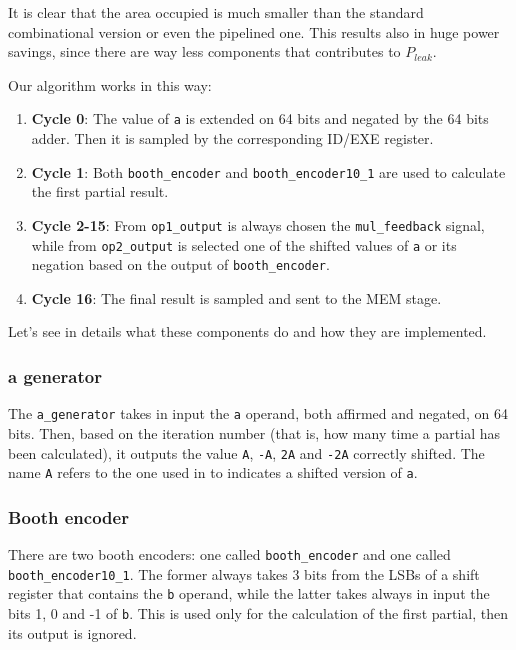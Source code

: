 It is clear that the area occupied is much smaller than the standard combinational version or even the pipelined one. This results also in huge power savings, since there are way
less components that contributes to $P_{leak}$.

Our algorithm works in this way:

\begin{enumerate}
    \item \textbf{Cycle 0}: The value of \verb|a| is extended on 64 bits and negated by the 64 bits adder. Then it is sampled by the corresponding ID/EXE register.
    \item \textbf{Cycle 1}: Both \verb|booth_encoder| and \verb|booth_encoder10_1| are used to calculate the first partial result.
    \item \textbf{Cycle 2-15}: From \verb|op1_output| is always chosen the \verb|mul_feedback| signal, while from \verb|op2_output| is selected one of the shifted values of \verb|a| or its negation based on the output of \verb|booth_encoder|.
    \item \textbf{Cycle 16}: The final result is sampled and sent to the MEM stage.
\end{enumerate}

Let's see in details what these components do and how they are implemented.

\subsubsection{a generator}

The \verb|a_generator| takes in input the \verb|a| operand, both affirmed and negated, on 64 bits. Then, based on the iteration number (that is, how many time a partial has been calculated),
it outputs the value \verb|A|, \verb|-A|, \verb|2A| and \verb|-2A| correctly shifted. The name \verb|A| refers to the one used in \cite{ln} to indicates a shifted version of \verb|a|.

\subsubsection{Booth encoder}

There are two booth encoders: one called \verb|booth_encoder| and one called \verb|booth_encoder10_1|. The former always takes 3 bits from the LSBs of a shift register that contains the \verb|b| operand,
while the latter takes always in input the bits 1, 0 and -1 of \verb|b|. This is used only for the calculation of the first partial, then its output is ignored.

